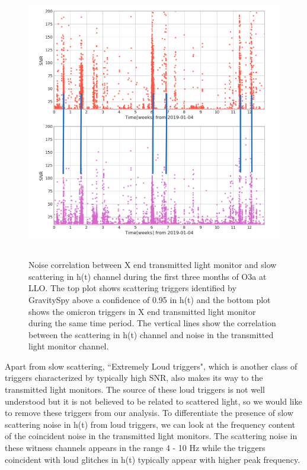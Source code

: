 \documentclass[12pt]{iopart}
\begin{document}
\begin{figure}[h]
  \centering
         \includegraphics[width = 14cm,height=12cm]{htxtrb_corr5.png}
         \caption{Noise correlation between X end transmitted light monitor and slow scattering in h(t) channel during the first three months of O3a at LLO. The top plot shows scattering triggers identified by GravitySpy above a confidence of 0.95 in h(t) and the bottom plot shows the omicron triggers in X end transmitted light monitor during the same time period. The vertical lines show the correlation between the scattering in h(t) channel and noise in the transmitted light monitor channel.}
    \label{fig:transetmx}
\end{figure}

Apart from slow scattering, ``Extremely Loud triggers", which is another class of triggers characterized by typically high SNR, also makes its way to the transmitted light monitors. The source of these loud triggers is not well understood but it is not believed to be related to scattered light, so we would like to remove these triggers from our analysis. To differentiate the presence of slow scattering noise in h(t) from loud triggers, we can look at the frequency content of the coincident noise in the transmitted light monitors. The scattering noise in these witness channels appears in the range  4 - 10 Hz while the triggers coincident with loud glitches in h(t) typically appear with higher peak frequency. 
\end{document}
